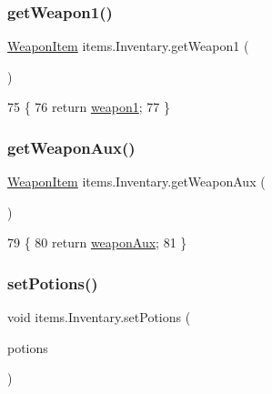 \subsubsection{\texorpdfstring{get\+Weapon1()}{getWeapon1()}}
{\footnotesize\ttfamily \mbox{\hyperlink{classitems_1_1_weapon_item}{Weapon\+Item}} items.\+Inventary.\+get\+Weapon1 (\begin{DoxyParamCaption}{ }\end{DoxyParamCaption})\hspace{0.3cm}{\ttfamily [inline]}}


\begin{DoxyCode}
75                                    \{
76         \textcolor{keywordflow}{return} \mbox{\hyperlink{classitems_1_1_inventary_ad16ddfb714d749294e1fe64841ca9074}{weapon1}};
77     \}
\end{DoxyCode}
\mbox{\label{classitems_1_1_inventary_aaae786de7d4cb302e79c5f549fd2b608}} 
\subsubsection{\texorpdfstring{get\+Weapon\+Aux()}{getWeaponAux()}}
{\footnotesize\ttfamily \mbox{\hyperlink{classitems_1_1_weapon_item}{Weapon\+Item}} items.\+Inventary.\+get\+Weapon\+Aux (\begin{DoxyParamCaption}{ }\end{DoxyParamCaption})\hspace{0.3cm}{\ttfamily [inline]}}


\begin{DoxyCode}
79                                      \{
80         \textcolor{keywordflow}{return} \mbox{\hyperlink{classitems_1_1_inventary_a1f8cf512e097112b449136da9c6670b7}{weaponAux}};
81     \}
\end{DoxyCode}
\mbox{\label{classitems_1_1_inventary_a9d214c7fe7f1c10fc4d036676f1860a4}} 
\subsubsection{\texorpdfstring{set\+Potions()}{setPotions()}}
{\footnotesize\ttfamily void items.\+Inventary.\+set\+Potions (\begin{DoxyParamCaption}\item[{Array\+List$<$ \mbox{\hyperlink{classitems_1_1_potion}{Potion}} $>$}]{potions }\end{DoxyParamCaption})\hspace{0.3cm}{\ttfamily [inline]}}


